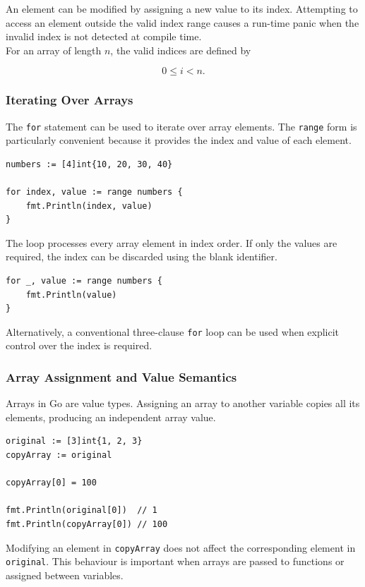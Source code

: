 An element can be modified by assigning a new value to its index. Attempting to access an element outside the valid index range causes a run-time panic when the invalid index is not detected at compile time.\\

For an array of length \(n\), the valid indices are defined by

\[
0 \leq i < n.
\]

\subsubsection{Iterating Over Arrays}

The \texttt{for} statement can be used to iterate over array elements. The \texttt{range} form is particularly convenient because it provides the index and value of each element.

\begin{lstlisting}
numbers := [4]int{10, 20, 30, 40}

for index, value := range numbers {
    fmt.Println(index, value)
}
\end{lstlisting}

The loop processes every array element in index order. If only the values are required, the index can be discarded using the blank identifier.

\begin{lstlisting}
for _, value := range numbers {
    fmt.Println(value)
}
\end{lstlisting}

Alternatively, a conventional three-clause \texttt{for} loop can be used when explicit control over the index is required.

\subsubsection{Array Assignment and Value Semantics}

Arrays in Go are value types. Assigning an array to another variable copies all its elements, producing an independent array value.

\begin{lstlisting}
original := [3]int{1, 2, 3}
copyArray := original

copyArray[0] = 100

fmt.Println(original[0])  // 1
fmt.Println(copyArray[0]) // 100
\end{lstlisting}

Modifying an element in \texttt{copyArray} does not affect the corresponding element in \texttt{original}. This behaviour is important when arrays are passed to functions or assigned between variables.\\

